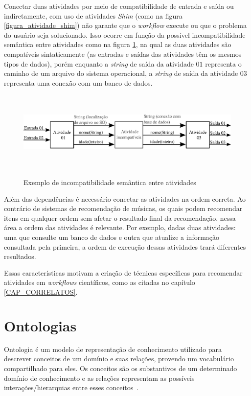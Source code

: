 Conectar duas atividades por meio de compatibilidade de entrada e saída ou indiretamente, com uso de atividades \emph{Shim} (como na figura \ref{figura_atividade_shim}) não garante que o \emph{workflow} execute ou que o problema do usuário seja solucionado. Isso ocorre em função da possível incompatibilidade semântica entre atividades como na figura \ref{figura_Incompatibilidade_Semantica}, 
na qual as duas atividades são compatíveis sintaticamente (as entradas e saídas das atividades têm os mesmos tipos de dados), porém enquanto a \emph{string} de saída da atividade \(01\) representa o caminho de um arquivo do sistema operacional, a \emph{string} de saída da atividade \(03\) representa uma conexão com um banco de dados.
\begin{figure}[!hbt]
    \centering  
    \caption{Exemplo de incompatibilidade semântica entre atividades}
    \includegraphics[width=13cm,height=4cm]{./secoes/conceitosFundamentais/pics/img/IncompatibilidadeSemantica.eps}    
	\label{figura_Incompatibilidade_Semantica}
	\vspace{0.1cm}
	\source{\varAutorData}
\end{figure}

Além das dependências é necessário conectar as atividades na ordem correta. Ao contrário de sistemas de recomendação de músicas, os quais podem recomendar itens em qualquer ordem sem afetar o resultado final da recomendação, nessa área a ordem das atividades é relevante. Por exemplo, dadas duas atividades: uma que consulte um banco de dados e outra que atualize a informação consultada pela primeira, a ordem de execução dessas atividades trará diferentes resultados.

Essas características motivam a criação de técnicas específicas para recomendar atividades em \emph{workflows} científicos, como as citadas no capítulo \ref{CAP_CORRELATOS}.

\section{Ontologias}\label{SEC_ONTOLOGIA}
Ontologia é um modelo de representação de conhecimento utilizado para descrever conceitos de um domínio e suas relações, provendo um vocabulário compartilhado para eles. Os conceitos são os substantivos de um determinado domínio de conhecimento e as relações representam as possíveis interações/hierarquias entre esses conceitos~\cite{Umamaheswari2012}.

